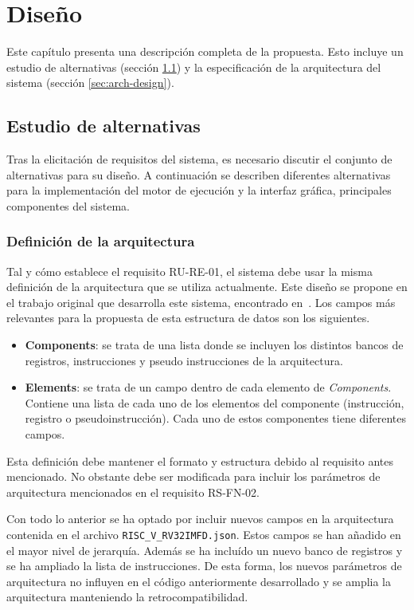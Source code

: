\chapter{Diseño}\label{chap:design}

Este capítulo presenta una descripción completa de la propuesta. Esto incluye
un estudio de alternativas (sección \ref{alternativas}) y la especificación de
la arquitectura del sistema (sección \ref{sec:arch-design}).

\section{Estudio de alternativas}\label{alternativas}
Tras la elicitación de requisitos del sistema, es necesario discutir el conjunto de alternativas para su diseño. A continuación se describen diferentes alternativas para la implementación del motor de ejecución y la interfaz gráfica, principales componentes del sistema.

\subsection{Definición de la arquitectura}\label{subsec:defi-arch}
Tal y cómo establece el requisito RU-RE-01, el sistema debe usar la misma definición de la arquitectura que se utiliza actualmente. Este diseño se propone en el trabajo original que desarrolla este sistema, encontrado en~\cite{camarmasCREATOR}. Los campos más relevantes para la propuesta de esta estructura de datos son los siguientes. 

\begin{itemize}
\item \textbf{Components}: se trata de una lista donde se incluyen los distintos bancos de registros, instrucciones y pseudo instrucciones de la arquitectura.
\item \textbf{Elements}: se trata de un campo dentro de cada elemento de \textit{Components}. Contiene una lista de cada uno de los elementos del componente (instrucción, registro o pseudoinstrucción). Cada uno de estos componentes tiene diferentes campos.
\end{itemize}

Esta definición debe mantener el formato y estructura debido al requisito antes mencionado. No obstante debe ser modificada para incluir los parámetros de arquitectura mencionados en el requisito RS-FN-02.

Con todo lo anterior se ha optado por incluir nuevos campos en la arquitectura contenida en el archivo \texttt{RISC\_V\_RV32IMFD.json}. Estos campos se han añadido en el mayor nivel de jerarquía. Además se ha incluído un nuevo banco de registros y se ha ampliado la lista de instrucciones. De esta forma, los nuevos parámetros de arquitectura no influyen en el código anteriormente desarrollado y se amplia la arquitectura manteniendo la retrocompatibilidad.

